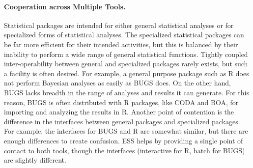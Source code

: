 \documentclass{article}
\newcommand{\stexttt}[1]{{\small\texttt{#1}}}
\newenvironment{Comment}{\begin{quote}\small\itshape }{\end{quote}}
\begin{document}

\paragraph{Cooperation across Multiple Tools.}
Statistical packages are intended for either general statistical
analyses or for specialized forms of statistical analyses.  The
specialized statistical packages can be far more efficient for their
intended activities, but this is balanced by their inability to
perform a wide range of general statistical functions.  Tightly
coupled inter-operability between general and specialized packages
rarely exists, but such a facility is often desired.  For example, a
general purpose package such as R does not perform Bayesian analyses
as easily as BUGS does.  On the other hand, BUGS lacks breadth in the
range of analyses and results it can generate.  For this reason, BUGS
is often distributed with R packages, like CODA and BOA, for importing
and analyzing the results in R.  Another point of contention is the
difference in the interfaces between general packages and specialized
packages.  For example, the interfaces for BUGS and R are somewhat
similar, but there are enough differences to create confusion.  ESS
helps by providing a single point of contact to both tools, though the
interfaces (interactive for R, batch for BUGS) are slightly different.


\end{document}
